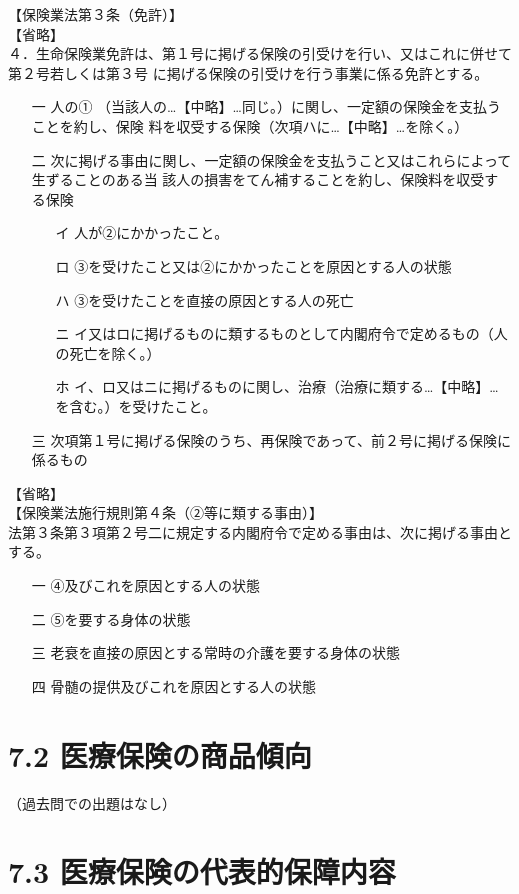 \documentclass[report,gutter=10mm,fore-edge=10mm,uplatex,dvipdfmx]{jlreq}
\begin{document}
【保険業法第３条（免許）】\\
【省略】\\

４．生命保険業免許は、第１号に掲げる保険の引受けを行い、又はこれに併せて第２号若しくは第３号
に掲げる保険の引受けを行う事業に係る免許とする。
\begin{itemize}
 \item [一]
人の①
（当該人の…【中略】…同じ。）に関し、一定額の保険金を支払うことを約し、保険
料を収受する保険（次項ハに…【中略】…を除く。）
 \item [二]
次に掲げる事由に関し、一定額の保険金を支払うこと又はこれらによって生ずることのある当
該人の損害をてん補することを約し、保険料を収受する保険
\begin{itemize}
 \item [イ]
 人が②にかかったこと。
 \item [ロ]
③を受けたこと又は②にかかったことを原因とする人の状態
 \item [ハ]
③を受けたことを直接の原因とする人の死亡
 \item [ニ]
 イ又はロに掲げるものに類するものとして内閣府令で定めるもの（人の死亡を除く。）
 \item [ホ]
 イ、ロ又はニに掲げるものに関し、治療（治療に類する…【中略】…を含む。）を受けたこと。
\end{itemize}
 \item [三] 次項第１号に掲げる保険のうち、再保険であって、前２号に掲げる保険に係るもの
\end{itemize}
【省略】\\
【保険業法施行規則第４条（②等に類する事由）】\\

法第３条第３項第２号二に規定する内閣府令で定める事由は、次に掲げる事由とする。
\begin{itemize}
 \item [一]
④及びこれを原因とする人の状態
 \item [二]⑤を要する身体の状態
 \item [三]老衰を直接の原因とする常時の介護を要する身体の状態
 \item [四]骨髄の提供及びこれを原因とする人の状態
\end{itemize}

\section{7.2 医療保険の商品傾向}
（過去問での出題はなし）
\section{7.3 医療保険の代表的保障内容}
\end{document}
